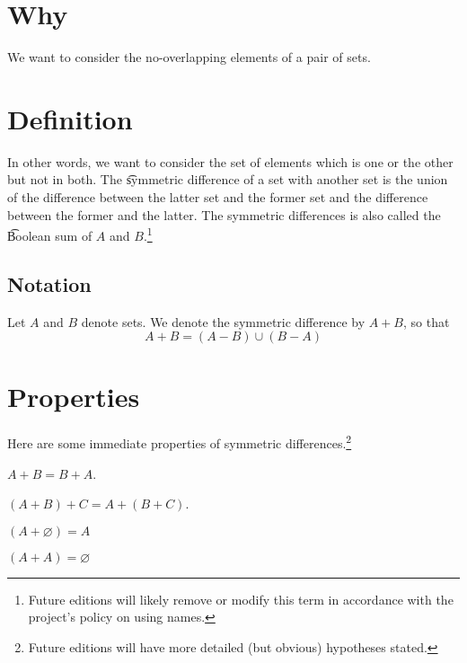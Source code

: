 

\section*{Why}

We want to consider the no-overlapping elements of a pair of sets.

\section*{Definition}

In other words, we want to consider the set of elements which is one or the other but not in both.
The \t{symmetric difference} of a set with another set is the union of the difference between the latter set and the former set and the difference between the former and the latter.
The symmetric differences is also called the \t{Boolean sum} of $A$ and $B$.\footnote{Future editions will likely remove or modify this term in accordance with the project's policy on using names.}

\subsection*{Notation}

Let $A$ and $B$ denote sets.
We denote the symmetric difference by $A + B$, so that
    \[
A + B = (A - B) \cup (B - A)
    \]

\section*{Properties}

Here are some immediate properties of symmetric differences.\footnote{Future editions will have more detailed (but obvious) hypotheses stated.}

\begin{proposition}[Commutative]
$A + B = B + A$.\end{proposition}
\begin{proposition}[Associative]
$(A + B) + C = A + (B + C)$.\end{proposition}
\begin{proposition}[Identity]
$(A + \varnothing) = A$\end{proposition}
\begin{proposition}[Inverse]
$(A + A) = \varnothing$\end{proposition}
\blankpage